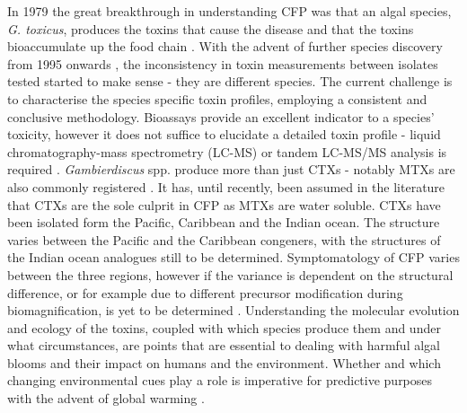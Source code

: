 \documentclass[12pt]{article}
\begin{document}
In 1979 the great breakthrough in understanding CFP was that an algal species, \emph{G. toxicus}, produces the toxins that cause the disease and that the toxins bioaccumulate up the food chain \cite{adachi1979thecal}. With the advent of further species discovery from 1995 onwards \cite{faust1995observation}, the inconsistency in toxin measurements between isolates tested started to make sense - they are different species. The current challenge is to characterise the species specific toxin profiles, employing a consistent and conclusive methodology. Bioassays provide an excellent indicator to a species' toxicity, however it does not suffice to elucidate a detailed toxin profile - liquid chromatography-mass spectrometry (LC-MS) or tandem LC-MS/MS analysis is required \cite{diogened2014chemistry}. \emph{Gambierdiscus} spp. produce more than just CTXs - notably MTXs are also commonly registered \cite{holmes1994purification,murata1993structure}. It has, until recently, been assumed in the literature that CTXs are the sole culprit in CFP as MTXs are water soluble. CTXs have been isolated form the Pacific, Caribbean and the Indian ocean. The  structure varies between the Pacific and the Caribbean congeners, with the structures of the Indian ocean analogues still to be determined. Symptomatology of CFP varies between the three regions, however if the variance is dependent on  the structural difference, or for example due to different precursor modification during biomagnification, is yet to be determined \cite{lewis2006ciguatera}. Understanding the molecular evolution and ecology of the toxins, coupled with which species produce them and under what circumstances, are points that are essential to dealing with harmful algal blooms and their impact on humans and the environment. Whether and which changing environmental cues play a role is imperative for predictive purposes with the advent of global warming \cite{llewellyn2010revisiting}.  \\
\end{document}
